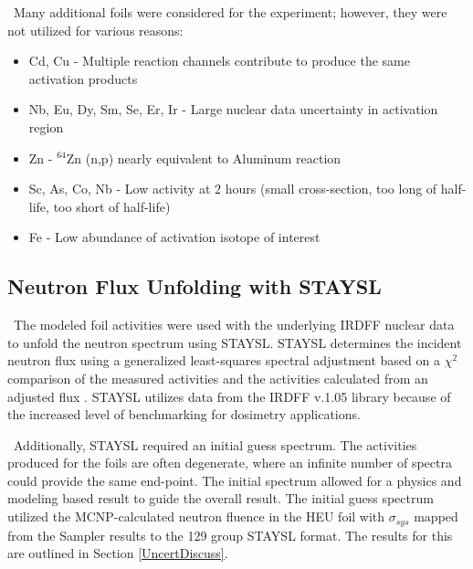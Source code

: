 \ Many additional foils were considered for the experiment; however, they were not utilized for various reasons:

\begin{itemize}	
	\item Cd, Cu - Multiple reaction channels contribute to produce the same activation products 
	\item Nb, Eu, Dy, Sm, Se, Er, Ir - Large nuclear data uncertainty in activation region 
	\item Zn - $\mathrm{^{64}Zn}$ (n,p) nearly equivalent to Aluminum reaction 
	\item Sc, As, Co, Nb - Low activity at 2 hours (small cross-section, too long of half-life, too short of half-life) 
	\item Fe - Low abundance of activation isotope of interest
\end{itemize}

\subsection{Neutron Flux Unfolding with STAYSL}\label{STAYSLthing}

\ The modeled foil activities were used with the underlying IRDFF nuclear data to unfold the neutron spectrum using STAYSL. 
STAYSL determines the incident neutron flux using a generalized least-squares spectral adjustment based on a $\chi^{2}$ comparison of the measured activities and the activities calculated from an adjusted flux \cite{Greenwood2016}. 
STAYSL utilizes data from the IRDFF v.1.05 library because of the increased level of benchmarking for dosimetry applications. 

\ Additionally, STAYSL required an initial guess spectrum. 
The activities produced for the foils are often degenerate, where an infinite number of spectra could provide the same end-point. 
The initial spectrum allowed for a physics and modeling based result to guide the overall result.  
The initial guess spectrum utilized the MCNP-calculated neutron fluence in the HEU foil with $\sigma_{sys}$ mapped from the Sampler results to the 129 group STAYSL format. The results for this are outlined in Section \ref{UncertDiscuss}.

